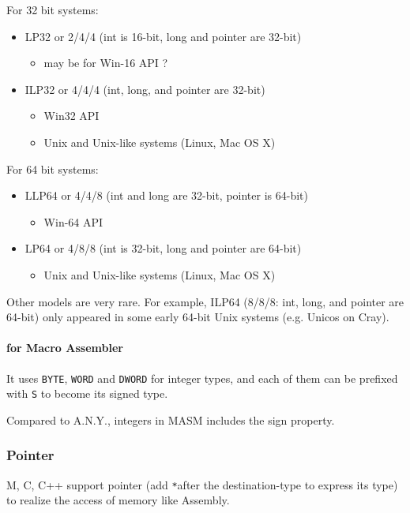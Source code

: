 
For 32 bit systems:
\begin{itemize}
	\item LP32 or 2/4/4 (int is 16-bit, long and pointer are 32-bit)\begin{itemize}
		\item may be for Win-16 API ?
	\end{itemize}
	\item ILP32 or 4/4/4 (int, long, and pointer are 32-bit)\begin{itemize}
		\item Win32 API
		\item Unix and Unix-like systems (Linux, Mac OS X)
	\end{itemize}
\end{itemize}

For 64 bit systems:
\begin{itemize}
	\item LLP64 or 4/4/8 (int and long are 32-bit, pointer is 64-bit)\begin{itemize}
		\item Win-64 API
	\end{itemize}
	\item LP64 or 4/8/8 (int is 32-bit, long and pointer are 64-bit)\begin{itemize}
		\item Unix and Unix-like systems (Linux, Mac OS X)
	\end{itemize}
\end{itemize}

Other models are very rare. For example, ILP64 (8/8/8: int, long, and pointer are 64-bit) only appeared in some early 64-bit Unix systems (e.g. Unicos on Cray).

\paragraph{for Macro Assembler}
It uses \verb`BYTE`, \verb`WORD` and \verb`DWORD` for integer types, and each of them can be prefixed with \verb`S` to become its signed type.

Compared to A.N.Y., integers in MASM includes the sign property.

\subsubsection{Pointer}

M, C, C++ support pointer (add \verb`*`after the destination-type to express its type) to realize the access of memory like Assembly.

